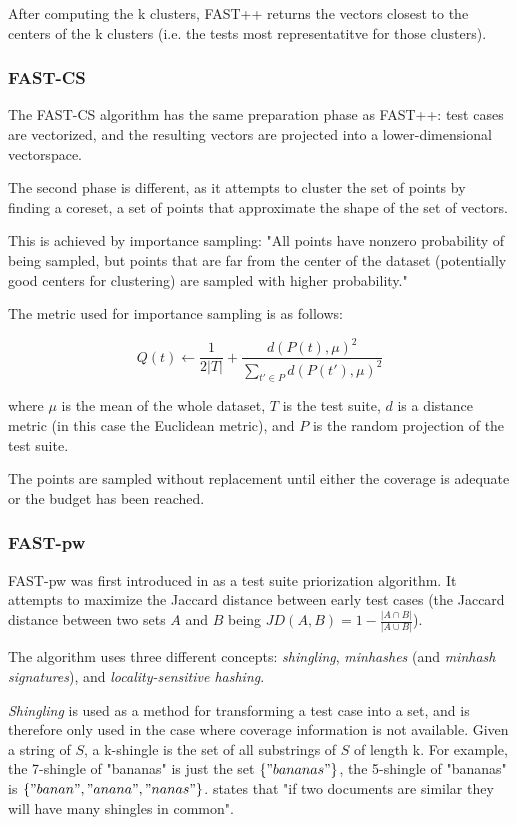 After computing the k clusters, FAST++ returns the vectors closest to
the centers of the k clusters (i.e. the tests most representatitve for
those clusters).

\subsubsection{FAST-CS}

The FAST-CS algorithm has the same preparation phase as FAST++: test
cases are vectorized, and the resulting vectors are projected into a
lower-dimensional vectorspace.

The second phase is different, as it attempts to cluster the set of
points by finding a coreset, a set of points that approximate the shape
of the set of vectors.


This is achieved by importance sampling: "All points have nonzero
probability of being sampled, but points that are far from the center
of the dataset (potentially good centers for clustering) are sampled
with higher probability."

The metric used for importance sampling is as follows:

$$
	Q(t) \leftarrow \frac{1}{2|T|}+\frac{d(P(t),\mu)^2}{\sum_{t' \in P}d(P(t'),\mu)^2}
$$

where $\mu$ is the mean of the whole dataset, $T$ is the test suite,
$d$ is a distance metric (in this case the Euclidean metric), and $P$
is the random projection of the test suite.

The points are sampled without replacement until either the coverage is
adequate or the budget has been reached.

\subsubsection{FAST-pw}

FAST-pw was first introduced in \cite{miranda2018fast} as a test suite
priorization algorithm. It attempts to maximize the Jaccard distance
between early test cases (the Jaccard distance between two sets $A$
and $B$ being $JD(A, B)=1-\frac{|A \cap B|}{|A \cup B|}$).

The algorithm uses three different concepts: \textit{shingling},
\textit{minhashes} (and \textit{minhash signatures}), and
\textit{locality-sensitive hashing}.

\textit{Shingling} is used as a method for transforming a test case into
a set, and is therefore only used in the case where coverage information
is not available. Given a string of $S$, a k-shingle is the set of all
substrings of $S$ of length k. For example, the 7-shingle of "bananas"
is just the set $\{"bananas"\}$, the 5-shingle of "bananas" is $\{"banan",
"anana", "nanas"\}$. \cite{miranda2018fast} states that "if two documents
are similar they will have many shingles in common".

